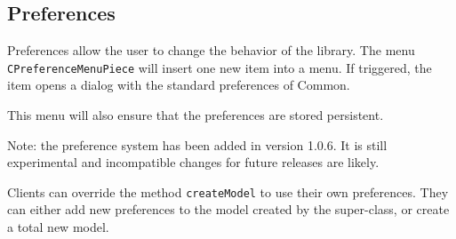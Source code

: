 \documentclass[a4paper,10pt]{article}
\newcommand{\src}[1]{\lstinline[basicstyle=\ttfamily]|#1|}
\begin{document}
\subsection{Preferences}
Preferences allow the user to change the behavior of the library. The menu \src{CPreferenceMenuPiece} will insert one new item into a menu. If triggered, the item opens a dialog with the standard preferences of Common.

This menu will also ensure that the preferences are stored persistent.

Note: the preference system has been added in version 1.0.6. It is still experimental and incompatible changes for future releases are likely.

Clients can override the method \src{createModel} to use their own preferences. They can either add new preferences to the model created by the super-class, or create a total new model.
\end{document}
